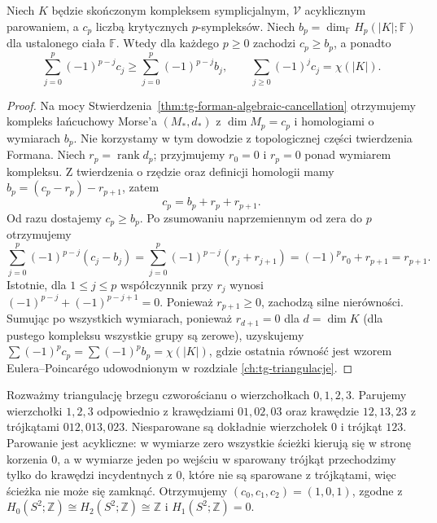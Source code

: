 \begin{twierdzenie}
\label{thm:tg-forman-ineq}
Niech $K$ będzie skończonym kompleksem symplicjalnym,
$\mathcal V$ acyklicznym parowaniem, a $c_p$ liczbą
krytycznych $p$-sympleksów. Niech
$b_p=\dim_{\mathbb F}H_p(|K|;\mathbb F)$
dla ustalonego ciała $\mathbb F$. Wtedy dla każdego
$p\ge0$ zachodzi $c_p\ge b_p$, a ponadto
\[
 \sum_{j=0}^p(-1)^{p-j}c_j
 \ge \sum_{j=0}^p(-1)^{p-j}b_j,
 \qquad
 \sum_{j\ge0}(-1)^jc_j=\chi(|K|).
\]
\end{twierdzenie}

\begin{proof}
Na mocy Stwierdzenia~\ref{thm:tg-forman-algebraic-cancellation}
otrzymujemy kompleks łańcuchowy Morse'a $(M_*,d_*)$
z $\dim M_p=c_p$ i homologiami o wymiarach $b_p$.
Nie korzystamy w tym dowodzie z topologicznej
części twierdzenia Formana.
Niech $r_p=\operatorname{rank}d_p$; przyjmujemy
$r_0=0$ i $r_p=0$ ponad wymiarem kompleksu.
Z twierdzenia o rzędzie oraz definicji homologii mamy
$b_p=(c_p-r_p)-r_{p+1}$, zatem
\[
 c_p=b_p+r_p+r_{p+1}.
\]
Od razu dostajemy $c_p\ge b_p$.
Po zsumowaniu naprzemiennym od zera do $p$
otrzymujemy
\[
 \sum_{j=0}^{p}(-1)^{p-j}(c_j-b_j)
 =\sum_{j=0}^{p}(-1)^{p-j}(r_j+r_{j+1})
 =(-1)^p r_0+r_{p+1}=r_{p+1}.
\]
Istotnie, dla $1\le j\le p$ współczynnik przy $r_j$
wynosi $(-1)^{p-j}+(-1)^{p-j+1}=0$.
Ponieważ $r_{p+1}\ge0$, zachodzą silne nierówności. Sumując po wszystkich wymiarach,
ponieważ $r_{d+1}=0$ dla $d=\dim K$ (dla pustego
kompleksu wszystkie grupy są zerowe), uzyskujemy
$\sum(-1)^pc_p=\sum(-1)^pb_p=\chi(|K|)$,
gdzie ostatnia równość jest wzorem Eulera--Poincarégo
udowodnionym w rozdziale \ref{ch:tg-triangulacje}.
\end{proof}

\begin{przyklad}
Rozważmy triangulację brzegu czworościanu o wierzchołkach
$0,1,2,3$. Parujemy wierzchołki $1,2,3$
odpowiednio z krawędziami $01,02,03$ oraz krawędzie
$12,13,23$ z trójkątami $012,013,023$.
Niesparowane są dokładnie wierzchołek $0$ i trójkąt
$123$. Parowanie jest acykliczne: w wymiarze zero
wszystkie ścieżki kierują się w stronę korzenia $0$,
a w wymiarze jeden po wejściu w sparowany trójkąt
przechodzimy tylko do krawędzi incydentnych z $0$,
które nie są sparowane z trójkątami, więc ścieżka
nie może się zamknąć. Otrzymujemy
$(c_0,c_1,c_2)=(1,0,1)$, zgodne z
$H_0(S^2;\mathbb Z)\cong H_2(S^2;\mathbb Z)
\cong\mathbb Z$ i $H_1(S^2;\mathbb Z)=0$.
\end{przyklad}

